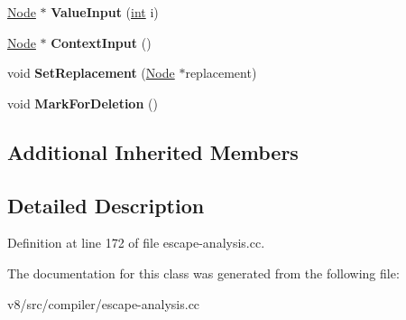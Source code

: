 \begin{DoxyCompactItemize}
\item 
\mbox{\label{classv8_1_1internal_1_1compiler_1_1EscapeAnalysisTracker_1_1Scope_a4067acbc106be214dc8501410371e41f}} 
\mbox{\hyperlink{classv8_1_1internal_1_1compiler_1_1Node}{Node}} $\ast$ {\bfseries Value\+Input} (\mbox{\hyperlink{classint}{int}} i)
\item 
\mbox{\label{classv8_1_1internal_1_1compiler_1_1EscapeAnalysisTracker_1_1Scope_a011daa8f170aee2f4002ce23b6bfd949}} 
\mbox{\hyperlink{classv8_1_1internal_1_1compiler_1_1Node}{Node}} $\ast$ {\bfseries Context\+Input} ()
\item 
\mbox{\label{classv8_1_1internal_1_1compiler_1_1EscapeAnalysisTracker_1_1Scope_ad95e0ff57346b1f361a21aae0538dfcd}} 
void {\bfseries Set\+Replacement} (\mbox{\hyperlink{classv8_1_1internal_1_1compiler_1_1Node}{Node}} $\ast$replacement)
\item 
\mbox{\label{classv8_1_1internal_1_1compiler_1_1EscapeAnalysisTracker_1_1Scope_aeaf1a8242ea4b17e25498c599c6080ea}} 
void {\bfseries Mark\+For\+Deletion} ()
\end{DoxyCompactItemize}
\subsection*{Additional Inherited Members}


\subsection{Detailed Description}


Definition at line 172 of file escape-\/analysis.\+cc.



The documentation for this class was generated from the following file\+:\begin{DoxyCompactItemize}
\item 
v8/src/compiler/escape-\/analysis.\+cc\end{DoxyCompactItemize}
